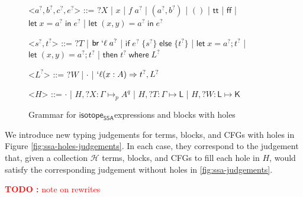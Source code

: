 \documentclass[acmsmall,screen,review]{acmart}
\newcounter{todos}
\newcommand{\TODO}[1]{{
  \stepcounter{todos}
  \begin{center}\large{\textcolor{red}{\textbf{TODO \arabic{todos}:} #1}}\end{center}
}}
\newcommand{\mc}[1]{\ensuremath{\mathcal{#1}}}
\newcommand{\ms}[1]{\ensuremath{\mathsf{#1}}}
\newcommand{\lbl}[1]{{`#1}}
\newcommand{\lto}{\Rightarrow}
\newcommand{\ctt}{\ms{tt}}
\newcommand{\cff}{\ms{ff}}
\newcommand{\letexpr}[3]{\ensuremath{\ms{let}\;#1 = #2\;\ms{in}\;#3}}
\newcommand{\letstmt}[3]{\ensuremath{\ms{let}\;#1 = #2; #3}}
\newcommand{\brb}[2]{\ms{br}\;#1\;#2}
\newcommand{\lbrb}[2]{\brb{\lbl{#1}}{#2}}
\newcommand{\ite}[3]{\ms{if}\;#1\;\{#2\}\;\ms{else}\;\{#3\}}
\newcommand{\ewhere}[2]{\ms{then}\;#1\;\ms{where}\;#2}
\newcommand{\wbranch}[3]{#1(#2) \lto #3}
\newcommand{\lwbranch}[3]{\wbranch{\lbl{#1}}{#2}{#3}}
\newcommand{\mhole}[1]{{#1}^?}
\newcommand{\lhole}[1]{?#1}
\newcommand{\tyhole}[5]{#1: #2 \mapsto_{#3} {#4}^{#5}}
\newcommand{\blkhole}[3]{#1: #2 \mapsto #3}
\newcommand{\cfghole}[3]{#1: #2 \mapsto #3}
\newcommand{\isotopessa}{\ms{isotope_{SSA}}}
\begin{document}
\begin{figure}
  \begin{grammar}
    <\(\mhole{a}, \mhole{b}, \mhole{c}, \mhole{e}\)> ::= \(\lhole{X}\)
    \;|\; \(x\) 
    \;|\; \(f\;\mhole{a}\)
    \;|\; \((\mhole{a}, \mhole{b})\) 
    \;|\; \(()\) 
    \;|\; \(\ctt\) 
    \;|\; \(\cff\)
    \;|\; \(\letexpr{x}{\mhole{a}}{\mhole{e}}\)
    \;|\; \(\letexpr{(x, y)}{\mhole{a}}{\mhole{e}}\)

    <\(\mhole{s}, \mhole{t}\)> ::= \(\lhole{T}\) 
    \;|\; \(\lbrb{\ell}{\mhole{a}}\) 
    \;|\; \(\ite{\mhole{e}}{\mhole{s}}{\mhole{t}}\)
    \;|\; \(\letstmt{x}{\mhole{a}}{\mhole{t}}\)
    \;|\; \(\letstmt{(x, y)}{\mhole{a}}{\mhole{t}}\)
    \;|\; \(\ewhere{\mhole{t}}{\mhole{L}}\)

    <\(\mhole{L}\)> ::= \(\lhole{W}\) \;|\; \(\cdot\) \;|\; \(\lwbranch{\ell}{x: A}{\mhole{t}}, \mhole{L}\)

    <\(H\)> ::= \(\cdot\) 
    \;|\; \(H, \tyhole{\lhole{X}}{\Gamma}{p}{A}{q}\)
    \;|\; \(H, \blkhole{\lhole{T}}{\Gamma}{\ms{L}}\)
    \;|\; \(H, \cfghole{\lhole{W}}{\ms{L}}{\ms{K}}\)
  \end{grammar}
  \caption{Grammar for \isotopessa expressions and blocks with holes}
  \label{fig:blocks-with-holes-grammar}
\end{figure}


We introduce new typing judgements for terms, blocks, and CFGs with holes in
Figure \ref{fig:ssa-holes-judgements}. In each case, they correspond to the
judgement that, given a collection \(\mc{H}\) terms, blocks, and CFGs to fill
each hole in \(H\), would satisfy the corresponding judgement without holes in
\ref{fig:ssa-judgements}.

\TODO{note on rewrites}
\end{document}
